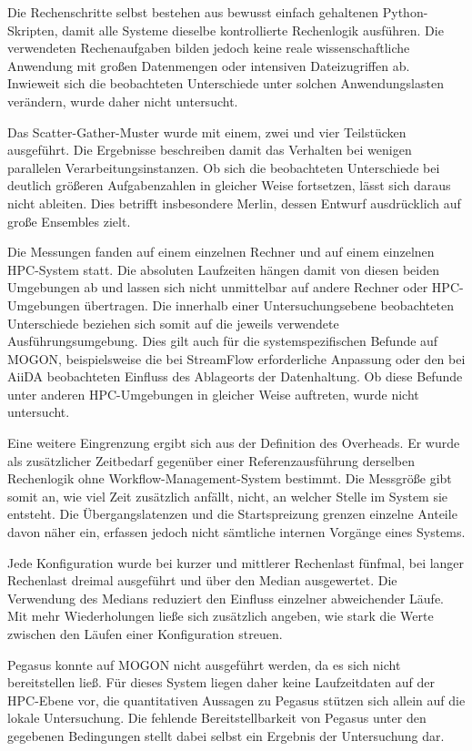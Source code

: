 Die Rechenschritte selbst bestehen aus bewusst einfach gehaltenen
Python-Skripten, damit alle Systeme dieselbe kontrollierte
Rechenlogik ausführen. Die verwendeten Rechenaufgaben bilden jedoch
keine reale wissenschaftliche Anwendung mit großen Datenmengen oder
intensiven Dateizugriffen ab. Inwieweit sich die beobachteten
Unterschiede unter solchen Anwendungslasten verändern, wurde daher
nicht untersucht.

Das Scatter-Gather-Muster wurde mit einem, zwei und vier
Teilstücken ausgeführt. Die Ergebnisse beschreiben damit das
Verhalten bei wenigen parallelen Verarbeitungsinstanzen. Ob sich
die beobachteten Unterschiede bei deutlich größeren Aufgabenzahlen
in gleicher Weise fortsetzen, lässt sich daraus nicht ableiten.
Dies betrifft insbesondere Merlin, dessen Entwurf ausdrücklich auf
große Ensembles zielt.

Die Messungen fanden auf einem einzelnen Rechner und auf einem
einzelnen HPC-System statt. Die absoluten Laufzeiten hängen damit
von diesen beiden Umgebungen ab und lassen sich nicht unmittelbar auf andere
Rechner oder HPC-Umgebungen übertragen.
Die innerhalb einer Untersuchungsebene beobachteten Unterschiede 
beziehen sich somit auf die jeweils verwendete Ausführungsumgebung.
Dies gilt auch für die systemspezifischen Befunde auf MOGON, 
beispielsweise die bei StreamFlow erforderliche Anpassung oder den bei AiiDA beobachteten Einfluss des Ablageorts der Datenhaltung. Ob diese Befunde unter
anderen HPC-Umgebungen in gleicher Weise auftreten, wurde nicht
untersucht.

Eine weitere Eingrenzung ergibt sich aus der Definition des
Overheads. Er wurde als zusätzlicher Zeitbedarf gegenüber einer
Referenzausführung derselben Rechenlogik ohne
Workflow-Management-System bestimmt. Die Messgröße gibt somit an,
wie viel Zeit zusätzlich anfällt, nicht, an welcher Stelle im
System sie entsteht. Die Übergangslatenzen und die Startspreizung
grenzen einzelne Anteile davon näher ein, erfassen jedoch nicht sämtliche internen Vorgänge eines Systems.

Jede Konfiguration wurde bei kurzer und mittlerer Rechenlast
fünfmal, bei langer Rechenlast dreimal ausgeführt und über den
Median ausgewertet. Die Verwendung des Medians reduziert den
Einfluss einzelner abweichender Läufe. Mit mehr Wiederholungen
ließe sich zusätzlich angeben, wie stark die Werte zwischen den
Läufen einer Konfiguration streuen.

Pegasus konnte auf MOGON nicht ausgeführt werden, da es sich
nicht bereitstellen ließ. Für dieses System liegen daher keine
Laufzeitdaten auf der HPC-Ebene vor, die quantitativen Aussagen zu
Pegasus stützen sich allein auf die lokale Untersuchung. Die
fehlende Bereitstellbarkeit von Pegasus unter den gegebenen
Bedingungen stellt dabei selbst ein Ergebnis der Untersuchung dar.